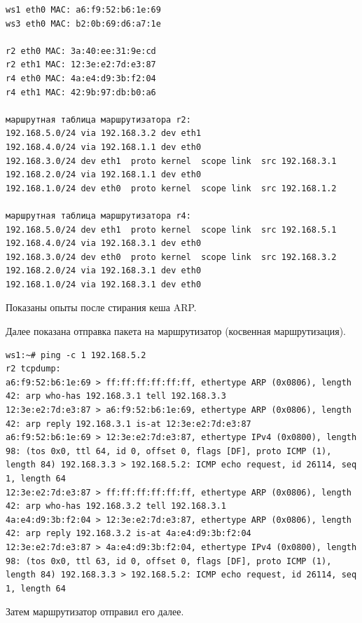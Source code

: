 \documentclass[a4paper,12pt]{article}
\begin{document}
\begin{Verbatim}
ws1 eth0 MAC: a6:f9:52:b6:1e:69
ws3 eth0 MAC: b2:0b:69:d6:a7:1e

r2 eth0 MAC: 3a:40:ee:31:9e:cd
r2 eth1 MAC: 12:3e:e2:7d:e3:87
r4 eth0 MAC: 4a:e4:d9:3b:f2:04
r4 eth1 MAC: 42:9b:97:db:b0:a6

маршрутная таблица маршрутизатора r2:
192.168.5.0/24 via 192.168.3.2 dev eth1 
192.168.4.0/24 via 192.168.1.1 dev eth0 
192.168.3.0/24 dev eth1  proto kernel  scope link  src 192.168.3.1 
192.168.2.0/24 via 192.168.1.1 dev eth0 
192.168.1.0/24 dev eth0  proto kernel  scope link  src 192.168.1.2 

маршрутная таблица маршрутизатора r4:
192.168.5.0/24 dev eth1  proto kernel  scope link  src 192.168.5.1 
192.168.4.0/24 via 192.168.3.1 dev eth0 
192.168.3.0/24 dev eth0  proto kernel  scope link  src 192.168.3.2 
192.168.2.0/24 via 192.168.3.1 dev eth0 
192.168.1.0/24 via 192.168.3.1 dev eth0 
\end{Verbatim}

Показаны опыты после стирания кеша ARP.

Далее показана отправка пакета на маршрутизатор (косвенная маршрутизация). 

\begin{Verbatim}
ws1:~# ping -c 1 192.168.5.2
r2 tcpdump:
a6:f9:52:b6:1e:69 > ff:ff:ff:ff:ff:ff, ethertype ARP (0x0806), length 42: arp who-has 192.168.3.1 tell 192.168.3.3
12:3e:e2:7d:e3:87 > a6:f9:52:b6:1e:69, ethertype ARP (0x0806), length 42: arp reply 192.168.3.1 is-at 12:3e:e2:7d:e3:87
a6:f9:52:b6:1e:69 > 12:3e:e2:7d:e3:87, ethertype IPv4 (0x0800), length 98: (tos 0x0, ttl 64, id 0, offset 0, flags [DF], proto ICMP (1), length 84) 192.168.3.3 > 192.168.5.2: ICMP echo request, id 26114, seq 1, length 64
12:3e:e2:7d:e3:87 > ff:ff:ff:ff:ff:ff, ethertype ARP (0x0806), length 42: arp who-has 192.168.3.2 tell 192.168.3.1
4a:e4:d9:3b:f2:04 > 12:3e:e2:7d:e3:87, ethertype ARP (0x0806), length 42: arp reply 192.168.3.2 is-at 4a:e4:d9:3b:f2:04
12:3e:e2:7d:e3:87 > 4a:e4:d9:3b:f2:04, ethertype IPv4 (0x0800), length 98: (tos 0x0, ttl 63, id 0, offset 0, flags [DF], proto ICMP (1), length 84) 192.168.3.3 > 192.168.5.2: ICMP echo request, id 26114, seq 1, length 64

\end{Verbatim}

Затем маршрутизатор отправил его далее.
\end{document}

